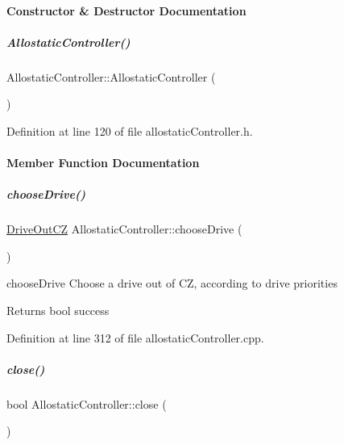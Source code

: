 \paragraph{Constructor \& Destructor Documentation}
\mbox{\label{group__allostaticController_ae80a5d7d6996241bbeeea5e32072e411}} 
\subparagraph{\texorpdfstring{Allostatic\+Controller()}{AllostaticController()}}
{\footnotesize\ttfamily Allostatic\+Controller\+::\+Allostatic\+Controller (\begin{DoxyParamCaption}{ }\end{DoxyParamCaption})\hspace{0.3cm}{\ttfamily [inline]}}



Definition at line 120 of file allostatic\+Controller.\+h.



\paragraph{Member Function Documentation}
\mbox{\label{group__allostaticController_a695d63459d3e78fdd5b024d5c3504742}} 
\subparagraph{\texorpdfstring{choose\+Drive()}{chooseDrive()}}
{\footnotesize\ttfamily \hyperlink{group__allostaticController_structDriveOutCZ}{Drive\+Out\+CZ} Allostatic\+Controller\+::choose\+Drive (\begin{DoxyParamCaption}{ }\end{DoxyParamCaption})}



choose\+Drive Choose a drive out of CZ, according to drive priorities 

\begin{DoxyReturn}{Returns}
bool success 
\end{DoxyReturn}


Definition at line 312 of file allostatic\+Controller.\+cpp.

\mbox{\label{group__allostaticController_a7968a168c0bf3409c0a82078e651cdbc}} 
\subparagraph{\texorpdfstring{close()}{close()}}
{\footnotesize\ttfamily bool Allostatic\+Controller\+::close (\begin{DoxyParamCaption}{ }\end{DoxyParamCaption})}



